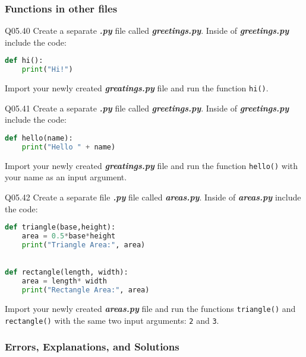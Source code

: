 \documentclass{book}
\newenvironment{problems}{}{}  %
\newcommand{\passthrough}[1]{#1}
\begin{document}
    
        \begin{problems}
        \hypertarget{functions-in-other-files}{%
\subsubsection{Functions in other
files}\label{functions-in-other-files}}

Q05.40 Create a separate \textbf{\emph{.py}} file called
\textbf{\emph{greetings.py}}. Inside of \textbf{\emph{greetings.py}}
include the code:

\begin{lstlisting}[language=Python]
def hi():
    print("Hi!")
\end{lstlisting}

Import your newly created \textbf{\emph{greatings.py}} file and run the
function \passthrough{\lstinline!hi()!}.

Q05.41 Create a separate \textbf{\emph{.py}} file called
\textbf{\emph{greetings.py}}. Inside of \textbf{\emph{greetings.py}}
include the code:

\begin{lstlisting}[language=Python]
def hello(name):
    print("Hello " + name)
\end{lstlisting}

Import your newly created \textbf{\emph{greatings.py}} file and run the
function \passthrough{\lstinline!hello()!} with your name as an input
argument.

Q05.42 Create a separate file \textbf{\emph{.py}} file called
\textbf{\emph{areas.py}}. Inside of \textbf{\emph{areas.py}} include the
code:

\begin{lstlisting}[language=Python]
def triangle(base,height):
    area = 0.5*base*height
    print("Triangle Area:", area)
    

def rectangle(length, width):
    area = length* width
    print("Rectangle Area:", area)
\end{lstlisting}

Import your newly created \textbf{\emph{areas.py}} file and run the
functions \passthrough{\lstinline!triangle()!} and
\passthrough{\lstinline!rectangle()!} with the same two input arguments:
\passthrough{\lstinline!2!} and \passthrough{\lstinline!3!}.
        \end{problems}

    




    
        \hypertarget{errors-explanations-and-solutions}{%
\subsubsection{Errors, Explanations, and
Solutions}\label{errors-explanations-and-solutions}}
\end{document}
